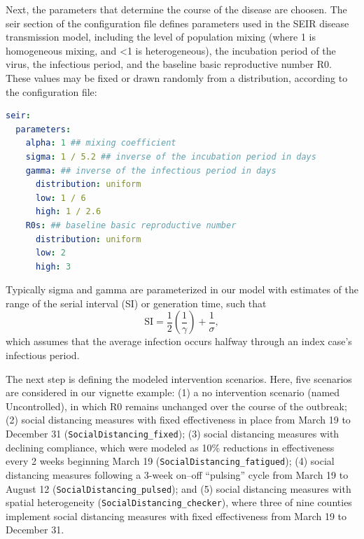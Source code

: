 Next, the parameters that determine the course of the disease are choosen. The seir section of the configuration file defines parameters used in the SEIR disease transmission model, including the level of population mixing (where 1 is homogeneous mixing, and <1 is heterogeneous), the incubation period of the virus, the infectious period, and the baseline basic reproductive number R0. These values may be fixed or drawn randomly from a distribution, according to the configuration file:
\begin{lstlisting}[language=yaml]
seir: 
  parameters: 
    alpha: 1 ## mixing coefficient 
    sigma: 1 / 5.2 ## inverse of the incubation period in days 
    gamma: ## inverse of the infectious period in days 
      distribution: uniform 
      low: 1 / 6 
      high: 1 / 2.6 
    R0s: ## baseline basic reproductive number 
      distribution: uniform 
      low: 2 
      high: 3
\end{lstlisting}

Typically sigma and gamma are parameterized in our model with estimates of the range of the serial interval (SI) or generation time, such that
\begin{equation}
\text{SI}=\frac{1}{2}\left(\frac{1}{\gamma }\right)+\frac{1}{\sigma },
\end{equation}
which assumes that the average infection occurs halfway through an index case’s infectious period.

The next step is defining the modeled intervention scenarios. Here, five scenarios are considered in our vignette example: (1) a no intervention scenario (named Uncontrolled), in which R0 remains unchanged over the course of the outbreak; (2) social distancing measures with fixed effectiveness in place from March 19 to December 31 (\verb|SocialDistancing_fixed|); (3) social distancing measures with declining compliance, which were modeled as 10\% reductions in effectiveness every 2 weeks beginning March 19 (\verb|SocialDistancing_fatigued|); (4) social distancing measures following a 3-week on–off “pulsing” cycle from March 19 to August 12 (\verb|SocialDistancing_pulsed|); and (5) social distancing measures with spatial heterogeneity (\verb|SocialDistancing_checker|), where three of nine counties implement social distancing measures with fixed effectiveness from March 19 to December 31.


